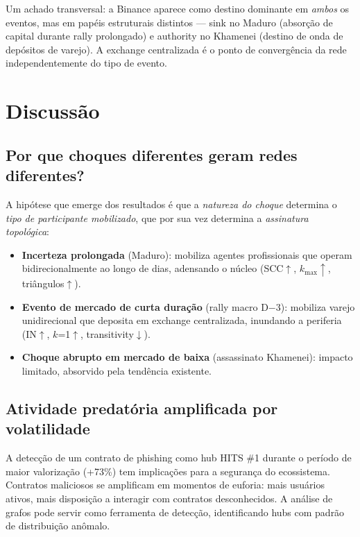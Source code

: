 \documentclass[12pt,a4paper]{article}
\begin{document}
Um achado transversal: a Binance aparece como destino dominante em \textit{ambos} os eventos, mas em papéis estruturais distintos --- sink no Maduro (absorção de capital durante rally prolongado) e authority no Khamenei (destino de onda de depósitos de varejo). A exchange centralizada é o ponto de convergência da rede independentemente do tipo de evento.

\section{Discussão}

\subsection{Por que choques diferentes geram redes diferentes?}

A hipótese que emerge dos resultados é que a \textit{natureza do choque} determina o \textit{tipo de participante mobilizado}, que por sua vez determina a \textit{assinatura topológica}:

\begin{itemize}[nosep]
\item \textbf{Incerteza prolongada} (Maduro): mobiliza agentes profissionais que operam bidirecionalmente ao longo de dias, adensando o núcleo (SCC$\uparrow$, $k_{\max}\uparrow$, triângulos$\uparrow$).
\item \textbf{Evento de mercado de curta duração} (rally macro D$-$3): mobiliza varejo unidirecional que deposita em exchange centralizada, inundando a periferia (IN$\uparrow$, $k$=1$\uparrow$, transitivity$\downarrow$).
\item \textbf{Choque abrupto em mercado de baixa} (assassinato Khamenei): impacto limitado, absorvido pela tendência existente.
\end{itemize}

\subsection{Atividade predatória amplificada por volatilidade}

A detecção de um contrato de phishing como hub HITS \#1 durante o período de maior valorização (+73\%) tem implicações para a segurança do ecossistema. Contratos maliciosos se amplificam em momentos de euforia: mais usuários ativos, mais disposição a interagir com contratos desconhecidos. A análise de grafos pode servir como ferramenta de detecção, identificando hubs com padrão de distribuição anômalo.
\end{document}
